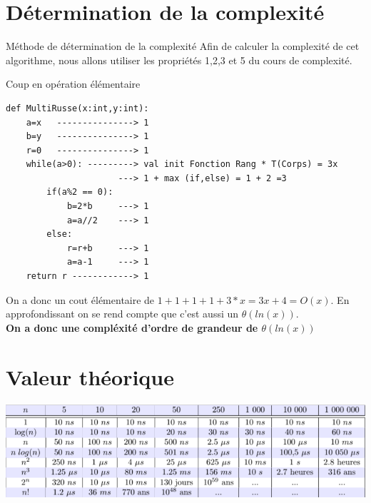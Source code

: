 \documentclass[12pt,a4paper]{report}
\begin{document}
\section{Détermination de la complexité}
\begin{mybox}{Méthode de détermination de la complexité}
Afin de calculer la complexité de cet algorithme, nous allons utiliser les propriétés 1,2,3 et 5 du cours de complexité.
\end{mybox}
\begin{Cas1}{Coup en opération élémentaire}
 \begin{lstlisting}
def MultiRusse(x:int,y:int):
    a=x   ---------------> 1
    b=y   ---------------> 1
    r=0   ---------------> 1
    while(a>0): ---------> val init Fonction Rang * T(Corps) = 3x
    	              ---> 1 + max (if,else) = 1 + 2 =3
    	if(a%2 == 0): 
            b=2*b     ---> 1
            a=a//2    ---> 1
        else:
            r=r+b     ---> 1
            a=a-1     ---> 1
    return r ------------> 1
\end{lstlisting}
\end{Cas1}
\begin{flushleft}
On a donc un cout élémentaire de $1+1+1+1+3*x=3x+4=O(x)$. En approfondissant on se rend compte que c'est aussi un $\theta(ln(x))$.\\
\textbf{On a donc une compléxité d'ordre de grandeur de $\theta(ln(x))$}
\end{flushleft}
\section{Valeur théorique}
\includegraphics[scale=1]{TableauThéorique}
\end{document}
